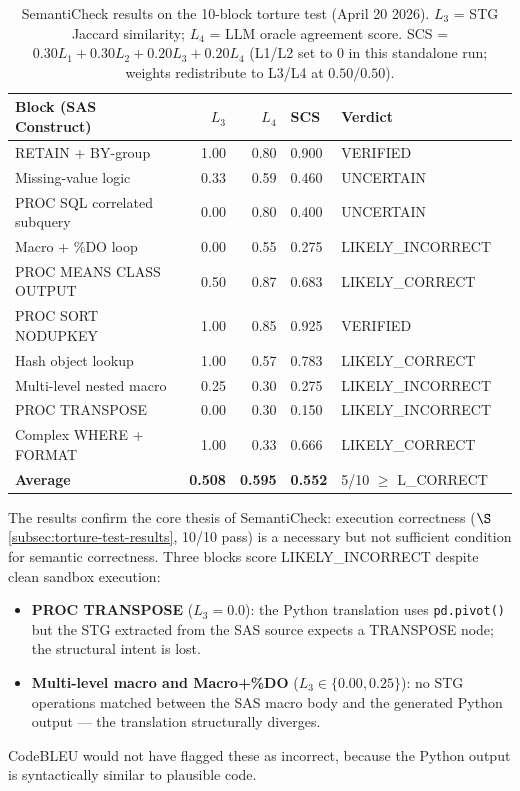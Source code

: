 \begin{table}[ht]
\centering
\caption{SemantiCheck results on the 10-block torture test (April 20 2026).
$L_3$ = STG Jaccard similarity; $L_4$ = LLM oracle agreement score.
SCS = $0.30 L_1 + 0.30 L_2 + 0.20 L_3 + 0.20 L_4$ (L1/L2 set to 0 in this
standalone run; weights redistribute to L3/L4 at $0.50/0.50$).}
\label{tab:semanticheck}
\small
\begin{tabular}{@{}lrrlll@{}}
\toprule
Block (SAS Construct) & $L_3$ & $L_4$ & SCS & Verdict \\
\midrule
RETAIN + BY-group & 1.00 & 0.80 & 0.900 & VERIFIED \\
Missing-value logic & 0.33 & 0.59 & 0.460 & UNCERTAIN \\
PROC SQL correlated subquery & 0.00 & 0.80 & 0.400 & UNCERTAIN \\
Macro + \%DO loop & 0.00 & 0.55 & 0.275 & LIKELY\_INCORRECT \\
PROC MEANS CLASS OUTPUT & 0.50 & 0.87 & 0.683 & LIKELY\_CORRECT \\
PROC SORT NODUPKEY & 1.00 & 0.85 & 0.925 & VERIFIED \\
Hash object lookup & 1.00 & 0.57 & 0.783 & LIKELY\_CORRECT \\
Multi-level nested macro & 0.25 & 0.30 & 0.275 & LIKELY\_INCORRECT \\
PROC TRANSPOSE & 0.00 & 0.30 & 0.150 & LIKELY\_INCORRECT \\
Complex WHERE + FORMAT & 1.00 & 0.33 & 0.666 & LIKELY\_CORRECT \\
\midrule
\textbf{Average} & \textbf{0.508} & \textbf{0.595} & \textbf{0.552} & 5/10 $\geq$ L\_CORRECT \\
\bottomrule
\end{tabular}
\end{table}

The results confirm the core thesis of SemantiCheck: execution correctness
($\S$\ref{subsec:torture-test-results}, 10/10 pass) is a necessary but not
sufficient condition for semantic correctness. Three blocks score LIKELY\_INCORRECT
despite clean sandbox execution:
\begin{itemize}
  \item \textbf{PROC TRANSPOSE} ($L_3 = 0.0$): the Python translation uses
    \texttt{pd.pivot()} but the STG extracted from the SAS source expects a
    TRANSPOSE node; the structural intent is lost.
  \item \textbf{Multi-level macro and Macro+\%DO} ($L_3 \in \{0.00, 0.25\}$):
    no STG operations matched between the SAS macro body and the generated
    Python output — the translation structurally diverges.
\end{itemize}
CodeBLEU would not have flagged these as incorrect, because the Python output
is syntactically similar to plausible code.

